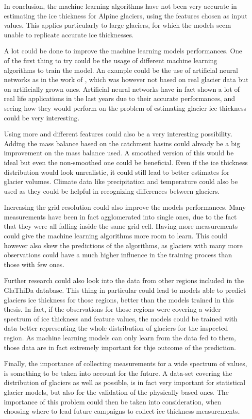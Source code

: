 In conclusion, the machine learning algorithms have not been very accurate in estimating the ice thickness for Alpine glaciers, using the features chosen as input values. This applies particularly to large glaciers, for which the models seem unable to replicate accurate ice thicknesses.

A lot could be done to improve the machine learning models performances. 
One of the first thing to try could be the usage of different machine learning algorithms to train the model. An example could be the use of artificial neural networks as in the work of \citet{Clarke2009}, which was however not based on real glacier data but on artificially grown ones. Artificial neural networks have in fact shown a lot of real life applications in the last years due to their accurate performances, and seeing how they would perform on the problem of estimating glacier ice thickness could be very interesting.
  
Using more and different features could also be a very interesting possibility. Adding the mass balance based on the catchment basins could already be a big improvement on the mass balance used. A smoothed version of this would be ideal but even the non-smoothed one could be beneficial. Even if the ice thickness distribution would look unrealistic, it could still lead to better estimates for glacier volumes. Climate data like precipitation and temperature could also be used as they could be helpful in recognizing differences between glaciers.

Increasing the grid resolution could also improve the models performances. Many measurements have been in fact agglomerated into single ones, due to the fact that they were all falling inside the same grid cell. Having more measurements could give the machine learning algorithms more room to learn. This could however also skew the predictions of the algorithms, as glaciers with many more observations could have a much higher influence in the training process than those with few ones. 
 
Further research could also look into the data from other regions included in the GlaThiDa database.  This thing in particular could lead to models able to predict glaciers ice thickness for those regions, better than the models trained in this thesis. In fact, if the observations for those regions were covering a wider spectrum of ice thickness and feature values, the models could be trained with data better representing the whole distribution of glaciers for the inspected region. As machine learning models can only learn from the data fed to them, those data are in fact extremely important for thje outcome of the prediction.
 
Finally, the importance of collecting measurements for a wide spectrum of values, is something to be taken into account for the future. A data-set covering the distribution of glaciers as well as possible, is in fact very important for statistical glacier models, but also for the validation of the physically based ones. The importance of this problem could then be taken into consideration, when choosing where to lead future campaigns to collect ice thickness measurements.
